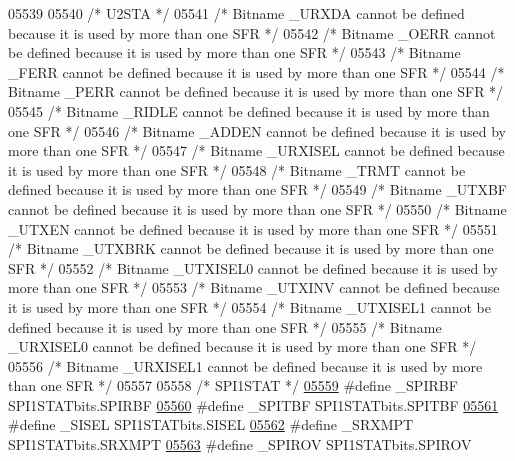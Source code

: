 \begin{DoxyCode}
05539 
05540 \textcolor{comment}{/* U2STA */}
05541 \textcolor{comment}{/* Bitname \_URXDA cannot be defined because it is used by more than one SFR */}
05542 \textcolor{comment}{/* Bitname \_OERR cannot be defined because it is used by more than one SFR */}
05543 \textcolor{comment}{/* Bitname \_FERR cannot be defined because it is used by more than one SFR */}
05544 \textcolor{comment}{/* Bitname \_PERR cannot be defined because it is used by more than one SFR */}
05545 \textcolor{comment}{/* Bitname \_RIDLE cannot be defined because it is used by more than one SFR */}
05546 \textcolor{comment}{/* Bitname \_ADDEN cannot be defined because it is used by more than one SFR */}
05547 \textcolor{comment}{/* Bitname \_URXISEL cannot be defined because it is used by more than one SFR */}
05548 \textcolor{comment}{/* Bitname \_TRMT cannot be defined because it is used by more than one SFR */}
05549 \textcolor{comment}{/* Bitname \_UTXBF cannot be defined because it is used by more than one SFR */}
05550 \textcolor{comment}{/* Bitname \_UTXEN cannot be defined because it is used by more than one SFR */}
05551 \textcolor{comment}{/* Bitname \_UTXBRK cannot be defined because it is used by more than one SFR */}
05552 \textcolor{comment}{/* Bitname \_UTXISEL0 cannot be defined because it is used by more than one SFR */}
05553 \textcolor{comment}{/* Bitname \_UTXINV cannot be defined because it is used by more than one SFR */}
05554 \textcolor{comment}{/* Bitname \_UTXISEL1 cannot be defined because it is used by more than one SFR */}
05555 \textcolor{comment}{/* Bitname \_URXISEL0 cannot be defined because it is used by more than one SFR */}
05556 \textcolor{comment}{/* Bitname \_URXISEL1 cannot be defined because it is used by more than one SFR */}
05557 
05558 \textcolor{comment}{/* SPI1STAT */}
\hypertarget{a00009_source_l05559}{}\hyperlink{a00009_ad14fb46d31b7217af0673d2c91f45734}{05559} \textcolor{preprocessor}{#define \_SPIRBF SPI1STATbits.SPIRBF}
\hypertarget{a00009_source_l05560}{}\hyperlink{a00009_a97399f3506368453ccdf4a152015396f}{05560} \textcolor{preprocessor}{#define \_SPITBF SPI1STATbits.SPITBF}
\hypertarget{a00009_source_l05561}{}\hyperlink{a00009_aeaf87947694bcec5e47ab4fb38c3ee40}{05561} \textcolor{preprocessor}{#define \_SISEL SPI1STATbits.SISEL}
\hypertarget{a00009_source_l05562}{}\hyperlink{a00009_a966c1dab06a08f4c44c632b66dadaf1d}{05562} \textcolor{preprocessor}{#define \_SRXMPT SPI1STATbits.SRXMPT}
\hypertarget{a00009_source_l05563}{}\hyperlink{a00009_abf1b272f53683ca9d8e5278b50eb85c2}{05563} \textcolor{preprocessor}{#define \_SPIROV SPI1STATbits.SPIROV}

\end{DoxyCode}
